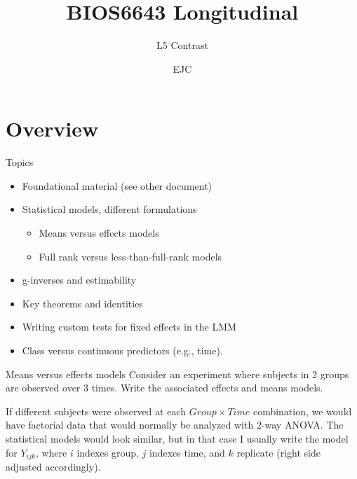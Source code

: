 \documentclass[
  9pt,
  ignorenonframetext,
]{beamer}
\title{BIOS6643 Longitudinal}
\subtitle{L5 Contrast}
\author{EJC}
\date{}
\institute{Department of Biostatistics \& Informatics}
\providecommand{\tightlist}{%
  \setlength{\itemsep}{0pt}\setlength{\parskip}{0pt}}
\begin{document}
\frame{\titlepage}

\begin{frame}[allowframebreaks]
  \tableofcontents[hideallsubsections]
\end{frame}
\hypertarget{overview}{%
\section{Overview}\label{overview}}

\begin{frame}{Topics}
\protect\hypertarget{topics}{}
\begin{itemize}
\item
  Foundational material (see other document)
\item
  Statistical models, different formulations

  \begin{itemize}
  \tightlist
  \item
    Means versus effects models
  \item
    Full rank versus less-than-full-rank models
  \end{itemize}
\item
  g-inverses and estimability
\item
  Key theorems and identities
\item
  Writing custom tests for fixed effects in the LMM
\item
  Class versus continuous predictors (e.g., time).
\end{itemize}
\end{frame}

\begin{frame}{Means versus effects models}
\protect\hypertarget{means-versus-effects-models}{}
Consider an experiment where subjects in 2 groups are observed over 3
times. Write the associated effects and means models.

\vspace{\baselineskip}
\vspace{\baselineskip}

If different subjects were observed at each \(Group \times Time\)
combination, we would have factorial data that would normally be
analyzed with 2-way ANOVA. The statistical models would look similar,
but in that case I usually write the model for \(Y_{ijk}\), where \(i\)
indexes group, \(j\) indexes time, and \(k\) replicate (right side
adjusted accordingly).
\end{frame}
\end{document}
